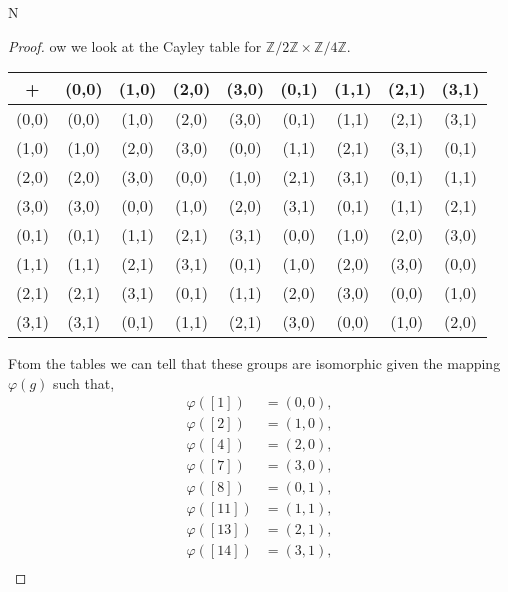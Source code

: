 \documentclass{article}
\newcommand{\Z}{\mathbb{Z}}
\newenvironment{hwproof}[1]
{
    #1
    \begin{proof}
}{
    \end{proof}
}
\begin{document}
\begin{hwproof}
    Now we look at the Cayley table for $\Z / 2\Z \times \Z / 4\Z$.
    \begin{center}
        \begin{tabular}{c | c c c c c c c c}
            +     & (0,0) & (1,0) & (2,0) & (3,0) & (0,1) & (1,1) & (2,1) & (3,1) \\
            \hline
            (0,0) & (0,0) & (1,0) & (2,0) & (3,0) & (0,1) & (1,1) & (2,1) & (3,1) \\
            (1,0) & (1,0) & (2,0) & (3,0) & (0,0) & (1,1) & (2,1) & (3,1) & (0,1) \\
            (2,0) & (2,0) & (3,0) & (0,0) & (1,0) & (2,1) & (3,1) & (0,1) & (1,1) \\
            (3,0) & (3,0) & (0,0) & (1,0) & (2,0) & (3,1) & (0,1) & (1,1) & (2,1) \\
            (0,1) & (0,1) & (1,1) & (2,1) & (3,1) & (0,0) & (1,0) & (2,0) & (3,0) \\
            (1,1) & (1,1) & (2,1) & (3,1) & (0,1) & (1,0) & (2,0) & (3,0) & (0,0) \\
            (2,1) & (2,1) & (3,1) & (0,1) & (1,1) & (2,0) & (3,0) & (0,0) & (1,0) \\
            (3,1) & (3,1) & (0,1) & (1,1) & (2,1) & (3,0) & (0,0) & (1,0) & (2,0) \\
        \end{tabular}
    \end{center}

    Ftom the tables we can tell that these groups are isomorphic given the mapping
    $\varphi(g)$ such that,
    \begin{align*}
        \varphi([1])  & = (0,0), \\
        \varphi([2])  & = (1,0), \\
        \varphi([4])  & = (2,0), \\
        \varphi([7])  & = (3,0), \\
        \varphi([8])  & = (0,1), \\
        \varphi([11]) & = (1,1), \\
        \varphi([13]) & = (2,1), \\
        \varphi([14]) & = (3,1), \\
    \end{align*}
\end{hwproof}
\end{document}
